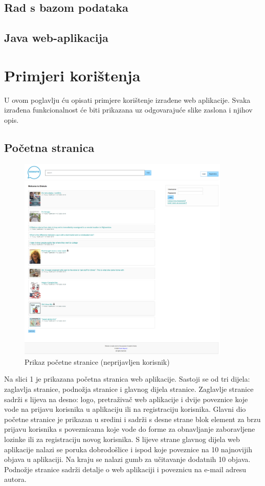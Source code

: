 \documentclass{foi}
\begin{document}
\section{Rad s bazom podataka}
\section{Java web-aplikacija}

\chapter{Primjeri korištenja}

U ovom poglavlju ću opisati primjere korištenje izrađene web aplikacije. Svaka izrađena funkcionalnost će biti prikazana uz odgovarajuće slike zaslona i njihov opis.

\section{Početna stranica}

\begin{figure}[h!]
    \centering
    \includegraphics[width=0.9\textwidth]{slike/pocetna.png}
    \caption{Prikaz početne stranice (neprijavljen korisnik)}
\end{figure}

Na slici 1 je prikazana početna stranica web aplikacije. Sastoji se od tri dijela: zaglavlja stranice, podnožja stranice i glavnog dijela stranice. Zaglavlje stranice sadrži s lijeva na desno: logo, pretraživač web aplikacije i dvije poveznice koje vode na prijavu korisnika u aplikaciju ili na registraciju korisnika. Glavni dio početne stranice je prikazan u sredini i sadrži s desne strane blok element za brzu prijavu korisnika s poveznicama koje vode do forme za obnavljanje zaboravljene lozinke ili za registraciju novog korisnika. S lijeve strane glavnog dijela web aplikacije nalazi se poruka dobrodošlice i ispod koje poveznice na 10 najnovijih objava u aplikaciji. Na kraju se nalazi gumb za učitavanje dodatnih 10 objava. Podnožje stranice sadrži detalje o web aplikaciji i poveznicu na e-mail adresu autora.
\end{document}
